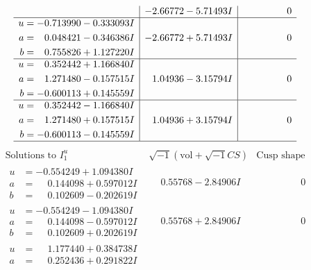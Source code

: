 \documentclass[1p]{elsarticle_modified}
\theoremstyle{definition}
\newcommand{\I}{\sqrt{-1}}
\begin{document}
$$\begin{array}{c|c|c}
 & -2.66772 - 5.71493 I & \phantom{-0.000000 } 0 \\ \hline\begin{aligned}
u &= -0.713990 - 0.333093 I \\
a &= \phantom{-}0.048421 - 0.346386 I \\
b &= \phantom{-}0.755826 + 1.127220 I\end{aligned}
 & -2.66772 + 5.71493 I & \phantom{-0.000000 } 0 \\ \hline\begin{aligned}
u &= \phantom{-}0.352442 + 1.166840 I \\
a &= \phantom{-}1.271480 - 0.157515 I \\
b &= -0.600113 + 0.145559 I\end{aligned}
 & \phantom{-}1.04936 - 3.15794 I & \phantom{-0.000000 } 0 \\ \hline\begin{aligned}
u &= \phantom{-}0.352442 - 1.166840 I \\
a &= \phantom{-}1.271480 + 0.157515 I \\
b &= -0.600113 - 0.145559 I\end{aligned}
 & \phantom{-}1.04936 + 3.15794 I & \phantom{-0.000000 } 0\\
 \hline 
 \end{array}$$\newpage$$\begin{array}{c|c|c}  
\text{Solutions to }I^u_{1}& \I (\text{vol} + \sqrt{-1}CS) & \text{Cusp shape}\\
 \hline 
\begin{aligned}
u &= -0.554249 + 1.094380 I \\
a &= \phantom{-}0.144098 + 0.597012 I \\
b &= \phantom{-}0.102609 - 0.202619 I\end{aligned}
 & \phantom{-}0.55768 - 2.84906 I & \phantom{-0.000000 } 0 \\ \hline\begin{aligned}
u &= -0.554249 - 1.094380 I \\
a &= \phantom{-}0.144098 - 0.597012 I \\
b &= \phantom{-}0.102609 + 0.202619 I\end{aligned}
 & \phantom{-}0.55768 + 2.84906 I & \phantom{-0.000000 } 0 \\ \hline\begin{aligned}
u &= \phantom{-}1.177440 + 0.384738 I \\
a &= \phantom{-}0.252436 + 0.291822 I \\

\end{aligned}
\end{array}$$
\end{document}

